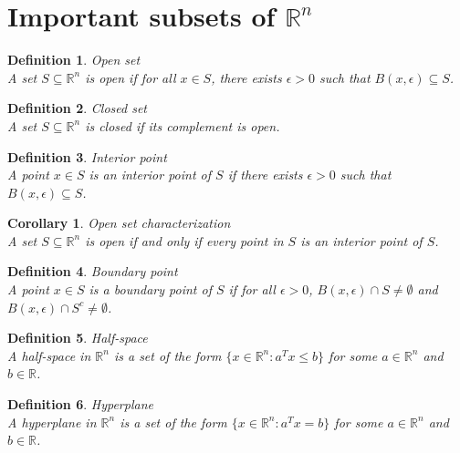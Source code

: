\documentclass[11pt]{book} %
\newtheorem{definition}{Definition}[section]
\newtheorem{corollary}{Corollary}[section]
\begin{document}
\section{Important subsets of $\mathbb{R}^n$}

\begin{definition}{Open set} \\
A set $S \subseteq \mathbb{R}^n$ is open if for all $x \in S$, there exists $\epsilon > 0$ such that $B(x, \epsilon) \subseteq S$.
\end{definition}

\begin{definition}{Closed set} \\
A set $S \subseteq \mathbb{R}^n$ is closed if its complement is open.
\end{definition}

\begin{definition}{Interior point} \\
A point $x \in S$ is an interior point of $S$ if there exists $\epsilon > 0$ such that $B(x, \epsilon) \subseteq S$.
\end{definition}

\begin{corollary}{Open set characterization} \\
A set $S \subseteq \mathbb{R}^n$ is open if and only if every point in $S$ is an interior point of $S$.
\end{corollary}

\begin{definition}{Boundary point} \\
A point $x \in S$ is a boundary point of $S$ if for all $\epsilon > 0$, $B(x, \epsilon) \cap S \neq \emptyset$ and $B(x, \epsilon) \cap S^c \neq \emptyset$.
\end{definition}

\begin{definition}{Half-space} \\
A half-space in $\mathbb{R}^n$ is a set of the form $\{x \in \mathbb{R}^n : a^T x \leq b\}$ for some $a \in \mathbb{R}^n$ and $b \in \mathbb{R}$.
\end{definition}

\begin{definition}{Hyperplane} \\
A hyperplane in $\mathbb{R}^n$ is a set of the form $\{x \in \mathbb{R}^n : a^T x = b\}$ for some $a \in \mathbb{R}^n$ and $b \in \mathbb{R}$.
\end{definition}
\end{document}
